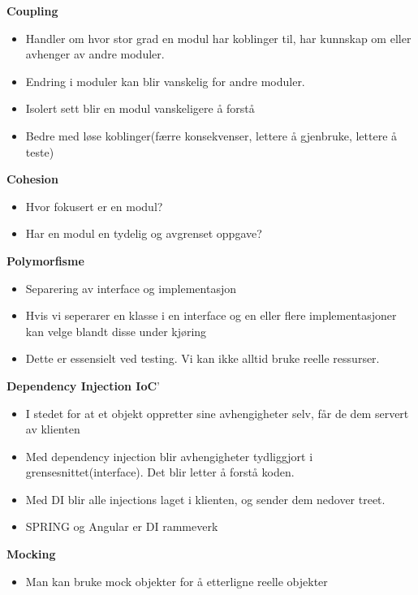 \documentclass{article}
\begin{document}
\begin{flushleft}
        \textbf{Coupling}
        \begin{itemize}
            \item Handler om hvor stor grad en modul har koblinger til, har kunnskap om eller avhenger av andre moduler.
            \item Endring i moduler kan blir vanskelig for andre moduler.
            \item Isolert sett blir en modul vanskeligere å forstå
            \item Bedre med løse koblinger(færre konsekvenser, lettere å gjenbruke, lettere å teste)
        \end{itemize}

        \textbf{Cohesion}
        \begin{itemize}
            \item Hvor fokusert er en modul?
            \item Har en modul en tydelig og avgrenset oppgave? 
        \end{itemize}


        \textbf{Polymorfisme}
        \begin{itemize}
            \item Separering av interface og implementasjon
            \item Hvis vi seperarer en klasse i en interface og en eller flere implementasjoner kan velge blandt disse under kjøring
            \item Dette er essensielt ved testing. Vi kan ikke alltid bruke reelle ressurser.
        \end{itemize}

        \textbf{Dependency Injection IoC}'
        \begin{itemize}
            \item I stedet for at et objekt oppretter sine avhengigheter selv, får de dem servert av klienten
            \item Med dependency injection blir avhengigheter tydliggjort i grensesnittet(interface). Det blir letter å forstå koden.
            \item Med DI blir alle injections laget i klienten, og sender dem nedover treet. 
            \item SPRING og Angular er DI rammeverk
        \end{itemize}

        \textbf{Mocking}
        \begin{itemize}
            \item Man kan bruke mock objekter for å etterligne reelle objekter
        \end{itemize}




    \end{flushleft}
\end{document}
